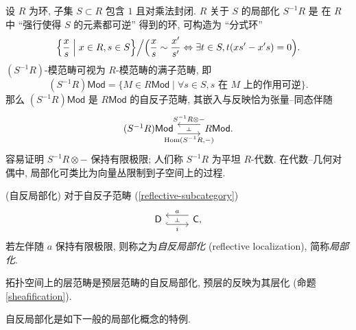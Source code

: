 \begin{example}
	{}
	设 $R$ 为环, 子集 $S\subset R$ 包含 $1$ 且对乘法封闭. $R$ 关于 $S$ 的局部化 $S^{-1}R$ 是
	在 $R$ 中 ``强行使得 $S$ 的元素都可逆'' 得到的环,
	可构造为 ``分式环'' $$
	\Big\{\frac{x}{s} \Bigm| x\in R, s\in S\Big\}\Big/
	\Big(
	\frac{x}{s}\sim\frac{x'}{s'}\Leftrightarrow\exists
	t\in S, t(xs'-x's)=0
	\Big).$$
	$(S^{-1}R)$-模范畴可视为 $R$-模范畴的满子范畴,
	即
	\[
	(S^{-1}R)\mathsf {Mod}=\{ M\in R\mathsf {Mod} \mid \forall s\in S,
	\text{$s$ 在 $M$ 上的作用可逆} \}.
	\]
	那么 $(S^{-1}R)\mathsf {Mod}$ 是 $R\mathsf {Mod}$ 的自反子范畴,
	其嵌入与反映恰为张量--同态伴随
	\[\begin{tikzcd}[ampersand replacement=\&]
		{(S^{-1}R)\mathsf {Mod}} \& {R\mathsf {Mod}.}
		\arrow[""{name=0, anchor=center, inner sep=0}, "{\operatorname{Hom}(S^{-1}R,-)}"', shift right=2, from=1-1, to=1-2]
		\arrow[""{name=1, anchor=center, inner sep=0}, "{S^{-1}R\otimes -}"', shift right=2, from=1-2, to=1-1]
		\arrow["\dashv"{anchor=center, rotate=-90}, draw=none, from=1, to=0]
	\end{tikzcd}\]
	容易证明 $S^{-1}R\otimes -$ 保持有限极限; 人们称 $S^{-1}R$ 为平坦 $R$-代数.
	在代数--几何对偶中, 局部化可类比为向量丛限制到子空间上的过程.
\end{example}

\begin{definition}
	[label={reflective-localization}]
	{(自反局部化)}
	对于自反子范畴 (\ref{reflective-subcategory}) $$
	\begin{tikzcd}[ampersand replacement=\&]
		{\mathsf D} \& {\mathsf C,}
		\arrow[""{name=0, anchor=center, inner sep=0}, "i"', shift right=2, hook, from=1-1, to=1-2]
		\arrow[""{name=1, anchor=center, inner sep=0}, "a"', shift right=2, from=1-2, to=1-1]
		\arrow["\dashv"{anchor=center, rotate=-90}, draw=none, from=1, to=0]
	\end{tikzcd}
	$$
	若左伴随 $a$ 保持有限极限, 则称之为\emph{自反局部化} (reflective localization), 简称\emph{局部化}.
\end{definition}

\begin{example}
	{}
	拓扑空间上的层范畴是预层范畴的自反局部化, 预层的反映为其层化 (命题 \ref{sheafification}).
\end{example}

% 

自反局部化是如下一般的局部化概念的特例.


